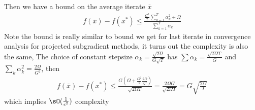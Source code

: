 \documentclass[../summary.tex]{subfiles}
\begin{document}
Then we have a bound on the average iterate $\overline{x}$
\begin{align*}
    f(\overline{x}) - f(x^*)
        \leq \frac{\frac{G^2}{2} \sum_{k=1}^T \alpha_k^2 + \Omega}{ \sum_{k=1}^T \alpha_k }
\end{align*}
Note the bound is really similar to bound we get for last iterate in convergence analysis for projected subgradient methods, it turns out the complexity is also the same, The choice of constant stepsize $\alpha_k = \frac{\sqrt{2\Omega}}{G\sqrt{T}}$ has $\sum \alpha_k = \frac{\sqrt{2\Omega T}}{G}$ and $\sum_k \alpha_k^2 = \frac{2\Omega}{G^2}$, then
\begin{align*}
    f(\overline{x}) - f(x^*)
        \leq \frac{ G(\Omega + \frac{G^2}{2}\frac{2\Omega}{G^2}) }{ \sqrt{2\Omega T} } 
        = \frac{2\Omega G}{\sqrt{2\Omega T}}
        = G \sqrt{\frac{2\Omega}{T}}
\end{align*}
which implies $\sO(\frac{1}{\epsilon^2})$ complexity
\end{document}
